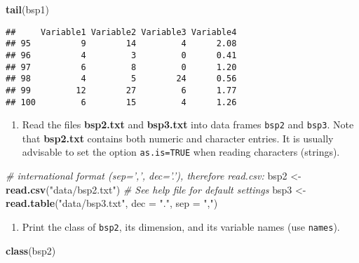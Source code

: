 \documentclass[]{article}
\newenvironment{Shaded}{\begin{snugshade}}{\end{snugshade}}
\newcommand{\KeywordTok}[1]{\textcolor[rgb]{0.13,0.29,0.53}{\textbf{#1}}}
\newcommand{\DataTypeTok}[1]{\textcolor[rgb]{0.13,0.29,0.53}{#1}}
\newcommand{\StringTok}[1]{\textcolor[rgb]{0.31,0.60,0.02}{#1}}
\newcommand{\CommentTok}[1]{\textcolor[rgb]{0.56,0.35,0.01}{\textit{#1}}}
\newcommand{\NormalTok}[1]{#1}
\providecommand{\tightlist}{%
  \setlength{\itemsep}{0pt}\setlength{\parskip}{0pt}}
\begin{document}
\begin{Shaded}
\begin{Highlighting}[]
\KeywordTok{tail}\NormalTok{(bsp1)}
\end{Highlighting}
\end{Shaded}

\begin{verbatim}
##     Variable1 Variable2 Variable3 Variable4
## 95          9        14         4      2.08
## 96          4         3         0      0.41
## 97          6         8         0      1.20
## 98          4         5        24      0.56
## 99         12        27         6      1.77
## 100         6        15         4      1.26
\end{verbatim}

\begin{enumerate}
\def\labelenumi{\arabic{enumi}.}
\setcounter{enumi}{1}
\tightlist
\item
  Read the files \textbf{bsp2.txt} and \textbf{bsp3.txt} into data
  frames \texttt{bsp2} and \texttt{bsp3}. Note that \textbf{bsp2.txt}
  contains both numeric and character entries. It is usually advisable
  to set the option \texttt{as.is=TRUE} when reading characters
  (strings).
\end{enumerate}

\begin{Shaded}
\begin{Highlighting}[]
\CommentTok{# international format (sep=',', dec='.'), therefore read.csv:}
\NormalTok{bsp2 <-}\StringTok{ }\KeywordTok{read.csv}\NormalTok{(}\StringTok{"data/bsp2.txt"}\NormalTok{)}
\CommentTok{# See help file for default settings}
\NormalTok{bsp3 <-}\StringTok{ }\KeywordTok{read.table}\NormalTok{(}\StringTok{"data/bsp3.txt"}\NormalTok{, }\DataTypeTok{dec =} \StringTok{"."}\NormalTok{, }\DataTypeTok{sep =} \StringTok{","}\NormalTok{)}
\end{Highlighting}
\end{Shaded}

\begin{enumerate}
\def\labelenumi{\arabic{enumi}.}
\setcounter{enumi}{2}
\tightlist
\item
  Print the class of \texttt{bsp2}, its dimension, and its variable
  names (use \texttt{names}).
\end{enumerate}

\begin{Shaded}
\begin{Highlighting}[]
\KeywordTok{class}\NormalTok{(bsp2)}
\end{Highlighting}
\end{Shaded}
\end{document}
